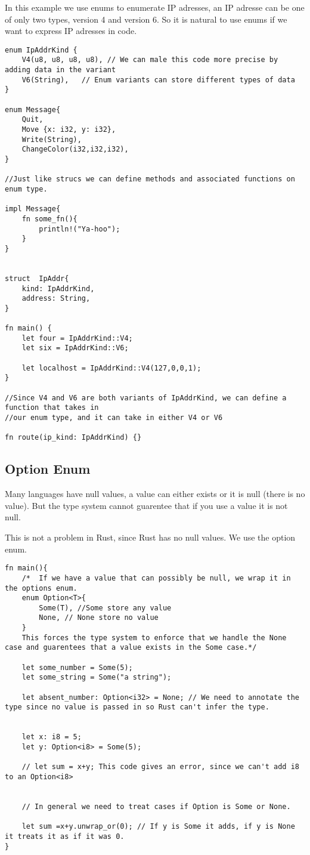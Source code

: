 \begin{example}
    In this example we use enums to enumerate IP adresses, an IP adresse can be one of only two types, version 4 and version 6. So it is natural to use enums 
if we want to express IP adresses in code.
\newpage
    \begin{lstlisting}
enum IpAddrKind {
    V4(u8, u8, u8, u8), // We can male this code more precise by adding data in the variant
    V6(String),   // Enum variants can store different types of data
}

enum Message{
    Quit,
    Move {x: i32, y: i32},
    Write(String),
    ChangeColor(i32,i32,i32),
}

//Just like strucs we can define methods and associated functions on enum type.

impl Message{
    fn some_fn(){
        println!("Ya-hoo");
    }
}


struct  IpAddr{
    kind: IpAddrKind,
    address: String,
}

fn main() {
    let four = IpAddrKind::V4;
    let six = IpAddrKind::V6;

    let localhost = IpAddrKind::V4(127,0,0,1);
}

//Since V4 and V6 are both variants of IpAddrKind, we can define a function that takes in
//our enum type, and it can take in either V4 or V6

fn route(ip_kind: IpAddrKind) {}
    \end{lstlisting}
\end{example}
\subsection{Option Enum}
Many languages have null values, a value can either exists or it is null (there is no value). But the type system cannot guarentee that if you use 
a value it is not null.

This is not a problem in Rust, since Rust has no null values. We use the option enum.

\begin{lstlisting}
fn main(){
    /*  If we have a value that can possibly be null, we wrap it in the options enum.
    enum Option<T>{
        Some(T), //Some store any value
        None, // None store no value
    }
    This forces the type system to enforce that we handle the None case and guarentees that a value exists in the Some case.*/
       
    let some_number = Some(5);
    let some_string = Some("a string");

    let absent_number: Option<i32> = None; // We need to annotate the type since no value is passed in so Rust can't infer the type.


    let x: i8 = 5;
    let y: Option<i8> = Some(5);

    // let sum = x+y; This code gives an error, since we can't add i8 to an Option<i8>
        

    // In general we need to treat cases if Option is Some or None.

    let sum =x+y.unwrap_or(0); // If y is Some it adds, if y is None it treats it as if it was 0.
}
\end{lstlisting}

